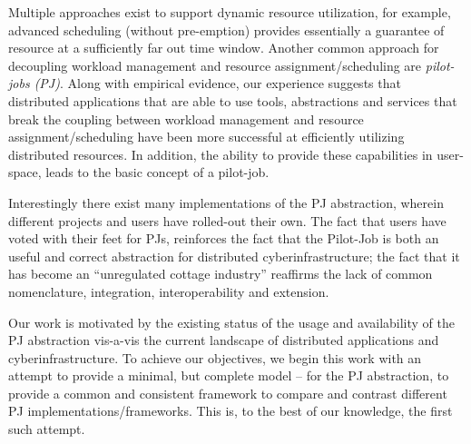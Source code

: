 \documentclass[conference,final]{IEEEtran}
\newcommand{\jhanote}[1]{ {\textcolor{red} { ***shantenu: #1 }}}
\newcommand{\jhanote}[1]{}
\begin{document}

Multiple approaches exist to support dynamic resource utilization, for
example, advanced scheduling (without pre-emption) provides
essentially a guarantee of resource %
at a sufficiently far out time window.  Another common approach for
decoupling workload management and resource assignment/scheduling are
\emph{pilot-jobs (PJ)}. Along with empirical evidence, our experience
suggests that distributed applications that are able to use tools,
abstractions and services that break the coupling between workload
management and resource assignment/scheduling have been more
successful at efficiently utilizing distributed resources. In
addition, the ability to provide these capabilities in user-space,
leads to the basic concept of a pilot-job.


Interestingly there exist many implementations of the PJ
abstraction, wherein different projects and users have rolled-out
their own. The fact that users have voted with their feet for
PJs, reinforces the fact that the Pilot-Job is both an useful
and correct abstraction for distributed cyberinfrastructure; the fact
that it has become an ``unregulated cottage industry'' reaffirms the
lack of common nomenclature, integration, interoperability and
extension.

Our work is motivated by the existing status of the usage and
availability of the PJ abstraction vis-a-vis the current
landscape of distributed applications and cyberinfrastructure.
To achieve our objectives, we begin this work with an attempt to
provide a minimal, but complete model -- for the PJ
abstraction, to provide a common and consistent framework to compare
and contrast different PJ implementations/frameworks. This is,
to the best of our knowledge, the first such attempt.
\end{document}
